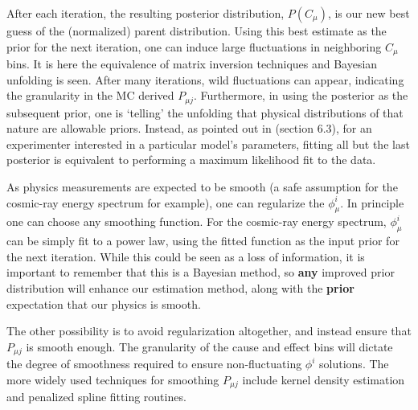 After each iteration, the resulting posterior distribution, $P(C_{\mu})$, is our new best guess 
of the (normalized) parent distribution. Using this best estimate as the prior for the next iteration,
one can induce large fluctuations in neighboring $C_{\mu}$ bins. It is here the equivalence of matrix inversion
techniques and Bayesian unfolding is seen. After many iterations, wild fluctuations can appear, indicating
the granularity in the MC derived $P_{\mu j}$. Furthermore, in using the posterior as the subsequent prior, 
one is `telling' the unfolding that physical distributions of that nature are allowable priors. Instead, as pointed
out in \cite{agostini} (section 6.3), for an experimenter interested in a particular model's parameters, 
fitting all but the last posterior is equivalent to performing a maximum likelihood fit to the data. 

As physics measurements are expected to be smooth (a safe assumption for the cosmic-ray energy 
spectrum for example), one can regularize the $\phi^{i}_{\mu}$. In principle one can choose any smoothing function. 
For the cosmic-ray energy spectrum, $\phi^{i}_{\mu}$ can be simply fit to a power law, using the 
fitted function as the input prior for the next iteration. While this could be seen as a loss of information, 
it is important to remember that this is a Bayesian method, so \textbf{any} improved prior distribution 
will enhance our estimation method, along with the \textbf{prior} expectation that our physics is smooth.

The other possibility is to avoid regularization altogether, and instead ensure that $P_{\mu j}$
is smooth enough. The granularity of the cause and effect bins will dictate the degree of smoothness 
required to ensure non-fluctuating $\phi^{i}$ solutions. The more widely used techniques for smoothing 
$P_{\mu j}$ include kernel density estimation and penalized spline fitting routines.
